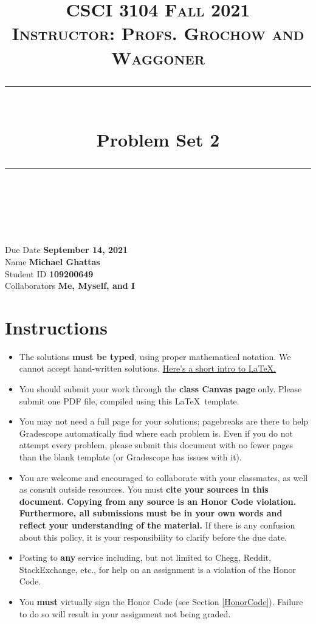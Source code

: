 \documentclass[11pt]{article}
\title{
\normalfont \normalsize 
\textsc{CSCI 3104 Fall 2021 \\ 
Instructor: Profs. Grochow and Waggoner} \\
[10pt] 
\rule{\linewidth}{0.5pt} \\[6pt] 
\huge Problem Set 2 \\
\rule{\linewidth}{2pt}  \\[10pt]
}
\date{}
\theoremstyle{definition}
\theoremstyle{definition}
\theoremstyle{definition}
\begin{document}

\maketitle


\noindent
Due Date \dotfill \textbf{September 14, 2021} \\
Name \dotfill \textbf{Michael Ghattas} \\
Student ID \dotfill \textbf{109200649} \\
Collaborators \dotfill \textbf{Me, Myself, and I}

\tableofcontents

\section{Instructions}
 \begin{itemize}
	\item The solutions \textbf{must be typed}, using proper mathematical notation. We cannot accept hand-written solutions. \href{http://ece.uprm.edu/~caceros/latex/introduction.pdf}{Here's a short intro to \LaTeX.}
	\item You should submit your work through the \textbf{class Canvas page} only. Please submit one PDF file, compiled using this \LaTeX \ template.
	\item You may not need a full page for your solutions; pagebreaks are there to help Gradescope automatically find where each problem is. Even if you do not attempt every problem, please submit this document with no fewer pages than the blank template (or Gradescope has issues with it).

	\item You are welcome and encouraged to collaborate with your classmates, as well as consult outside resources. You must \textbf{cite your sources in this document.} \textbf{Copying from any source is an Honor Code violation. Furthermore, all submissions must be in your own words and reflect your understanding of the material.} If there is any confusion about this policy, it is your responsibility to clarify before the due date. 

	\item Posting to \textbf{any} service including, but not limited to Chegg, Reddit, StackExchange, etc., for help on an assignment is a violation of the Honor Code.

	\item You \textbf{must} virtually sign the Honor Code (see Section \ref{HonorCode}). Failure to do so will result in your assignment not being graded.
\end{itemize}
\end{document}
